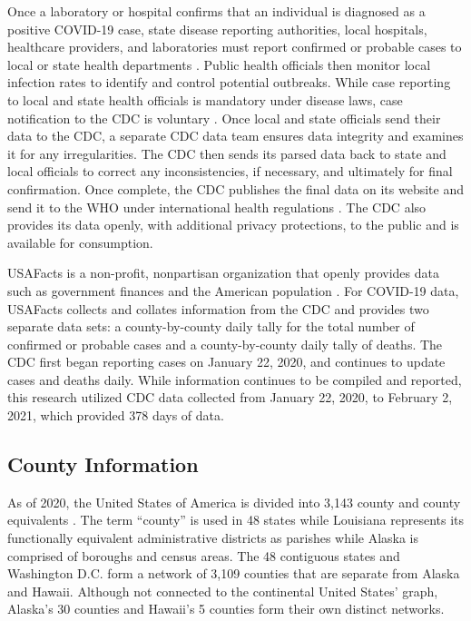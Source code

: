 Once a laboratory or hospital confirms that an individual is diagnosed as a positive {COVID-19} case, state disease reporting authorities, local hospitals, healthcare providers, and laboratories must report confirmed or probable cases to local or state health departments \cite{CDCFAQ}.  Public health officials then monitor local infection rates to identify and control potential outbreaks.  While case reporting to local and state health officials is mandatory under disease laws, case notification to the {CDC} is voluntary \cite{CDCFAQ}.  Once local and state officials send their data to the {CDC}, a separate {CDC} data team ensures data integrity and examines it for any irregularities.  The {CDC} then sends its parsed data back to state and local officials to correct any inconsistencies, if necessary, and ultimately for final confirmation.  Once complete, the {CDC} publishes the final data on its website and send it to the {WHO} under international health regulations \cite{CDCFAQ}.  The {CDC} also provides its data openly, with additional privacy protections, to the public and is available for consumption.

{USAFacts} is a non-profit, nonpartisan organization that openly provides data such as government finances and the American population \cite{AboutUSA15}.  For {COVID-19} data, {USAFacts} collects and collates information from the {CDC} and provides two separate data sets: a county-by-county daily tally for the total number of confirmed or probable cases and a county-by-county daily tally of deaths.  The {CDC} first began reporting cases on January 22, 2020, and continues to update cases and deaths daily.  While information continues to be compiled and reported, this research utilized {CDC} data collected from January 22, 2020, to February 2, 2021, which provided 378 days of data.

\subsection{County Information}
As of 2020, the United States of America is divided into 3,143 county and county equivalents \cite{UCSBcounties}.  The term ``county'' is used in 48 states while Louisiana represents its functionally equivalent administrative districts as parishes while Alaska is comprised of boroughs and census areas.  The 48 contiguous states and Washington D.C. form a network of 3,109 counties that are separate from Alaska and Hawaii.  Although not connected to the continental United States' graph, Alaska's 30 counties and Hawaii's 5 counties form their own distinct networks. 

